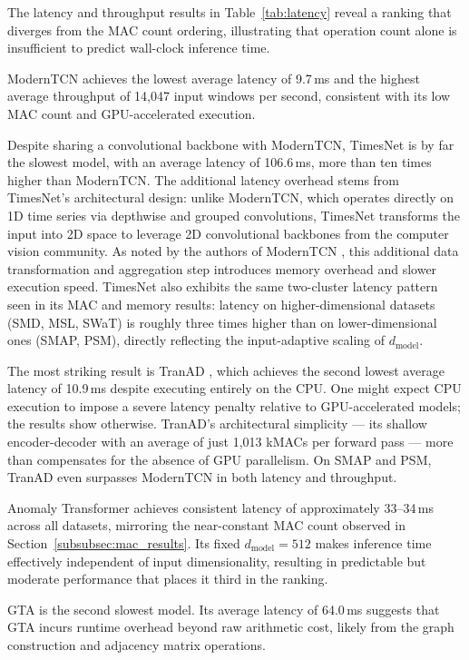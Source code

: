 \documentclass[twoside,11pt,openright]{report}
\begin{document}
The latency and throughput results in Table~\ref{tab:latency} reveal a ranking that
diverges from the MAC count ordering, illustrating that operation count
alone is insufficient to predict wall-clock inference time.

ModernTCN \citep{moderntcn2024} achieves the lowest average latency of 9.7\,ms and
the highest average throughput of 14{,}047 input windows per second, consistent with its
low MAC count and GPU-accelerated execution.

Despite sharing a convolutional backbone with ModernTCN, TimesNet
\citep{timesnet2023} is by far the slowest model, with an average latency of
106.6\,ms, more than ten times higher than ModernTCN. The additional latency 
overhead stems from
TimesNet's architectural design: unlike ModernTCN, which operates directly on 1D
time series via depthwise and grouped convolutions, TimesNet transforms the input
into 2D space to leverage 2D convolutional backbones from the computer vision
community. As noted by the authors of ModernTCN \citep{moderntcn2024}, this additional 
data transformation
and aggregation step introduces memory overhead and slower execution speed. 
TimesNet also exhibits the same
two-cluster latency pattern seen in its MAC and memory results: latency on
higher-dimensional datasets (SMD, MSL, SWaT) is roughly three times higher than
on lower-dimensional ones (SMAP, PSM), directly reflecting the input-adaptive
scaling of $d_\text{model}$.

The most striking result is TranAD \citep{tranad2022}, which achieves the second
lowest average latency of 10.9\,ms despite executing entirely on the CPU. One might
expect CPU execution to impose a severe latency penalty relative to GPU-accelerated
models; the results show otherwise. TranAD's architectural simplicity --- its shallow
encoder-decoder with an average of just 1{,}013 kMACs per forward pass ---
more than compensates for the absence of GPU parallelism. On SMAP and PSM,
TranAD even surpasses ModernTCN in both latency and throughput.

Anomaly Transformer \citep{anomalytransformer2022} achieves consistent latency of
approximately 33--34\,ms across all datasets, mirroring the near-constant MAC count
observed in Section~\ref{subsubsec:mac_results}. Its fixed $d_\text{model} = 512$
makes inference time effectively independent of input dimensionality, resulting in
predictable but moderate performance that places it third in the ranking.

GTA \citep{gta2022} is the second slowest model. Its average latency of 64.0\,ms suggests
that GTA incurs runtime overhead beyond raw arithmetic cost, likely from the
graph construction and adjacency matrix operations.
\end{document}
